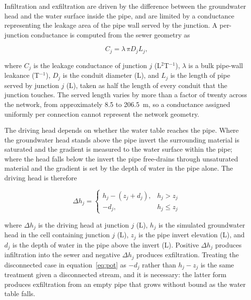 \documentclass[preprint,authoryear,11pt]{elsarticle}
\begin{document}
Infiltration and exfiltration are driven by the difference between the groundwater head and the water surface inside the pipe, and are limited by a conductance representing the leakage area of the pipe wall served by the junction. A per-junction conductance is computed from the sewer geometry as

\begin{equation}
  C_{j} = \lambda \, \pi D_{j} L_{j} ,
  \label{eq:pipecond}
\end{equation}

\noindent where $C_{j}$ is the leakage conductance of junction $j$ (L$^{2}$T$^{-1}$), $\lambda$ is a bulk pipe-wall leakance (T$^{-1}$), $D_{j}$ is the conduit diameter (L), and $L_{j}$ is the length of pipe served by junction $j$ (L), taken as half the length of every conduit that the junction touches. The served length varies by more than a factor of twenty across the network, from approximately 8.5 to \SI{206.5}{\meter}, so a conductance assigned uniformly per connection cannot represent the network geometry.

The driving head depends on whether the water table reaches the pipe. Where the groundwater head stands above the pipe invert the surrounding material is saturated and the gradient is measured to the water surface within the pipe; where the head falls below the invert the pipe free-drains through unsaturated material and the gradient is set by the depth of water in the pipe alone. The driving head is therefore

\begin{equation}
  \Delta h_{j} =
  \begin{cases}
    h_{j} - \left( z_{j} + d_{j} \right), & h_{j} > z_{j} \\[4pt]
    -d_{j},                                & h_{j} \le z_{j}
  \end{cases}
  \label{eq:pot}
\end{equation}

\noindent where $\Delta h_{j}$ is the driving head at junction $j$ (L), $h_{j}$ is the simulated groundwater head in the cell containing junction $j$ (L), $z_{j}$ is the pipe invert elevation (L), and $d_{j}$ is the depth of water in the pipe above the invert (L). Positive $\Delta h_{j}$ produces infiltration into the sewer and negative $\Delta h_{j}$ produces exfiltration. Treating the disconnected case in equation~\ref{eq:pot} as $-d_{j}$ rather than $h_{j} - z_{j}$ is the same treatment given a disconnected stream, and it is necessary: the latter form produces exfiltration from an empty pipe that grows without bound as the water table falls.
\end{document}
